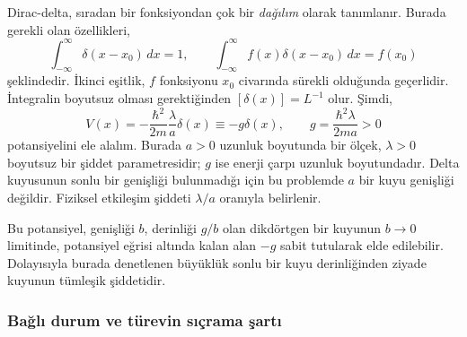 \documentclass[00_kitap.tex]{subfiles}
\begin{document}
Dirac-delta, sıradan bir fonksiyondan çok bir \emph{dağılım} olarak
tanımlanır. Burada gerekli olan özellikleri,
\begin{equation}
 \int_{-\infty}^{\infty}\delta(x-x_0)\,dx=1,
 \qquad
 \int_{-\infty}^{\infty}f(x)\delta(x-x_0)\,dx=f(x_0)
\end{equation}
şeklindedir. İkinci eşitlik, $f$ fonksiyonu $x_0$ civarında sürekli
olduğunda geçerlidir. İntegralin boyutsuz olması gerektiğinden
$[\delta(x)]=L^{-1}$ olur. Şimdi,
\begin{equation}
 V(x)=-\frac{\hbar^2}{2m}\frac{\lambda}{a}\delta(x)
      \equiv-g\delta(x),
 \qquad g=\frac{\hbar^2\lambda}{2ma}>0
 \label{eq:delta_tanim}
\end{equation}
potansiyelini ele alalım. Burada $a>0$ uzunluk boyutunda bir ölçek,
$\lambda>0$ boyutsuz bir şiddet parametresidir; $g$ ise enerji çarpı
uzunluk boyutundadır. Delta kuyusunun sonlu bir genişliği bulunmadığı
için bu problemde $a$ bir kuyu genişliği değildir. Fiziksel etkileşim
şiddeti $\lambda/a$ oranıyla belirlenir.

Bu potansiyel, genişliği $b$, derinliği $g/b$ olan dikdörtgen bir kuyunun
$b\to0$ limitinde, potansiyel eğrisi altında kalan alan $-g$ sabit
tutularak elde edilebilir. Dolayısıyla burada denetlenen büyüklük
sonlu bir kuyu derinliğinden ziyade kuyunun tümleşik şiddetidir.

\subsubsection{Bağlı durum ve türevin sıçrama şartı}
\end{document}
